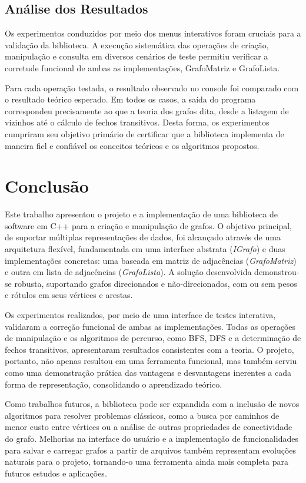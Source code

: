 \documentclass{sbc2023}%
\begin{document}
    \subsection{Análise dos Resultados}

        Os experimentos conduzidos por meio dos menus interativos foram cruciais para a validação da biblioteca. A execução sistemática das operações de criação, manipulação e consulta em diversos cenários de teste permitiu verificar a corretude funcional de ambas as implementações, GrafoMatriz e GrafoLista.
        
        Para cada operação testada, o resultado observado no console foi comparado com o resultado teórico esperado. Em todos os casos, a saída do programa correspondeu precisamente ao que a teoria dos grafos dita, desde a listagem de vizinhos até o cálculo de fechos transitivos. Desta forma, os experimentos cumpriram seu objetivo primário de certificar que a biblioteca implementa de maneira fiel e confiável os conceitos teóricos e os algoritmos propostos.       

\section{Conclusão}
\label{conclusao}

    Este trabalho apresentou o projeto e a implementação de uma biblioteca de software em C++ para a criação e manipulação de grafos. O objetivo principal, de suportar múltiplas representações de dados, foi alcançado através de uma arquitetura flexível, fundamentada em uma interface abstrata (\textit{IGrafo}) e duas implementações concretas: uma baseada em matriz de adjacências (\textit{GrafoMatriz}) e outra em lista de adjacências (\textit{GrafoLista}). A solução desenvolvida demonstrou-se robusta, suportando grafos direcionados e não-direcionados, com ou sem pesos e rótulos em seus vértices e arestas.
    
    Os experimentos realizados, por meio de uma interface de testes interativa, validaram a correção funcional de ambas as implementações. Todas as operações de manipulação e os algoritmos de percurso, como BFS, DFS e a determinação de fechos transitivos, apresentaram resultados consistentes com a teoria. O projeto, portanto, não apenas resultou em uma ferramenta funcional, mas também serviu como uma demonstração prática das vantagens e desvantagens inerentes a cada forma de representação, consolidando o aprendizado teórico.
    
    Como trabalhos futuros, a biblioteca pode ser expandida com a inclusão de novos algoritmos para resolver problemas clássicos, como a busca por caminhos de menor custo entre vértices ou a análise de outras propriedades de conectividade do grafo. Melhorias na interface do usuário e a implementação de funcionalidades para salvar e carregar grafos a partir de arquivos também representam evoluções naturais para o projeto, tornando-o uma ferramenta ainda mais completa para futuros estudos e aplicações.
    
\end{document}
